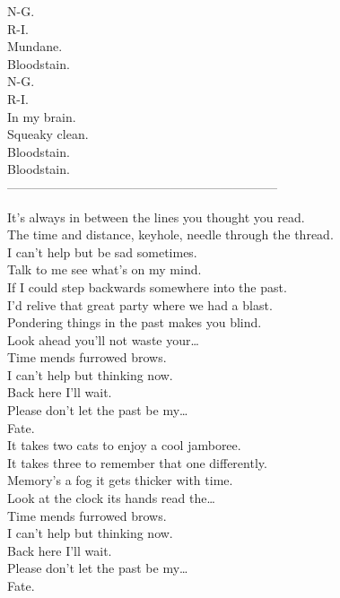 N-G. \\
R-I. \\
Mundane. \\
Bloodstain. \\
N-G. \\
R-I. \\
In my brain. \\
Squeaky clean. \\
Bloodstain. \\

Bloodstain. \\

-----------------------------------------------------------------



It's always in between the lines you thought you read. \\
The time and distance, keyhole, needle through the thread. \\
I can't help but be sad sometimes. \\
Talk to me see what's on my mind. \\

If I could step backwards somewhere into the past. \\
I'd relive that great party where we had a blast. \\
Pondering things in the past makes you blind. \\
Look ahead you'll not waste your… \\

Time mends furrowed brows. \\
I can't help but thinking now. \\
Back here I'll wait. \\
Please don't let the past be my… \\
Fate. \\

It takes two cats to enjoy a cool jamboree. \\
It takes three to remember that one differently. \\
Memory's a fog it gets thicker with time. \\
Look at the clock its hands read the… \\

Time mends furrowed brows. \\
I can't help but thinking now. \\
Back here I'll wait. \\
Please don't let the past be my… \\
Fate. \\

